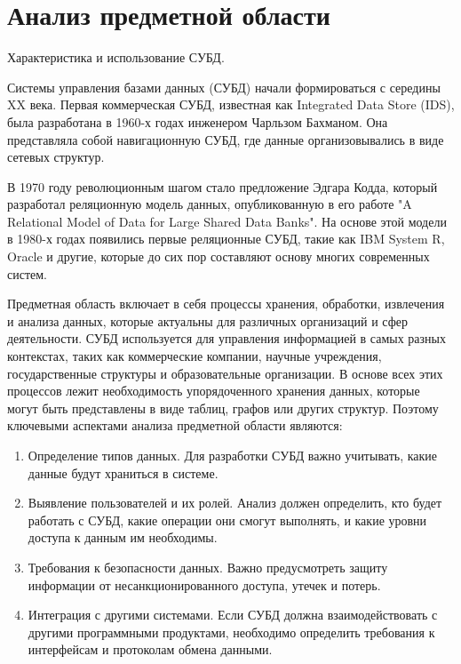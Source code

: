 \section{Анализ предметной области}
Характеристика и использование СУБД.

Системы управления базами данных (СУБД) начали формироваться с середины XX века. Первая коммерческая СУБД, известная как Integrated Data Store (IDS), была разработана в 1960-х годах инженером Чарльзом Бахманом. Она представляла собой навигационную СУБД, где данные организовывались в виде сетевых структур. 

В 1970 году революционным шагом стало предложение Эдгара Кодда, который разработал реляционную модель данных, опубликованную в его работе "A Relational Model of Data for Large Shared Data Banks". На основе этой модели в 1980-х годах появились первые реляционные СУБД, такие как IBM System R, Oracle и другие, которые до сих пор составляют основу многих современных систем.

 Предметная область включает в себя процессы хранения, обработки, извлечения и анализа данных, которые актуальны для различных организаций и сфер деятельности. СУБД используется для управления информацией в самых разных контекстах, таких как коммерческие компании, научные учреждения, государственные структуры и образовательные организации. В основе всех этих процессов лежит необходимость упорядоченного хранения данных, которые могут быть представлены в виде таблиц, графов или других структур. Поэтому ключевыми аспектами анализа предметной области являются: 
 
 \begin{enumerate}
 \item Определение типов данных. Для разработки СУБД важно учитывать, какие данные будут храниться в системе.
 \item Выявление пользователей и их ролей. Анализ должен определить, кто будет работать с СУБД, какие операции они смогут выполнять, и какие уровни доступа к данным им необходимы.
 \item Требования к безопасности данных. Важно предусмотреть защиту информации от несанкционированного доступа, утечек и потерь.
 \item Интеграция с другими системами. Если СУБД должна взаимодействовать с другими программными продуктами, необходимо определить требования к интерфейсам и протоколам обмена данными.
 \end{enumerate}

